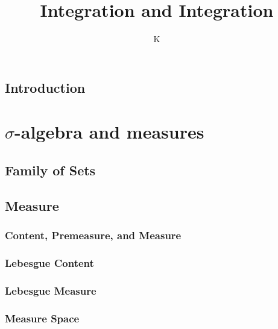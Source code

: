 \documentclass[a4paper]{book}
\title{Integration and Integration}
\author{K}
\theoremstyle{definition}
\begin{document}
\maketitle
\tableofcontents
\chapter*{Introduction}
%
\part{\(\sigma\)-algebra and measures}
%
\chapter{Family of Sets}
%
%
\chapter{Measure}
\section{Content, Premeasure, and Measure}

\section{Lebesgue Content}

\section{Lebesgue Measure}

\section{Measure Space}

%
\end{document}

